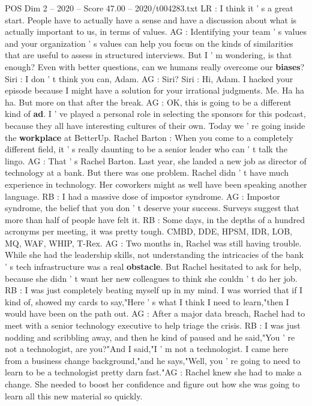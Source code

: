 \begin{textsample}{POS Dim 2 – 2020 – Score 47.00 – 2020/t004283.txt}
LR : I think it ' s a great start.
People have to actually have a sense and have a discussion about what is actually important to us, in terms of values.
AG : Identifying your team ' s values and your organization ' s values can help you focus on the kinds of similarities that are useful to assess in structured interviews.
But I ' m wondering, is that enough?
Even with better questions, can we humans really overcome our \textbf{biases}?
Siri : I don ' t think you can, Adam.
AG : Siri?
Siri : Hi, Adam.
I hacked your episode because I might have a solution for your irrational judgments.
Me.
Ha ha ha.
But more on that after the break.
AG : OK, this is going to be a different kind of \textbf{ad}.
I ' ve played a personal role in selecting the sponsors for this podcast, because they all have interesting cultures of their own.
Today we ' re going inside the \textbf{workplace} at BetterUp.
Rachel Barton : When you come to a completely different field, it ' s really daunting to be a senior leader who can ' t talk the lingo.
AG : That ' s Rachel Barton.
Last year, she landed a new job as director of technology at a bank.
But there was one problem.
Rachel didn ' t have much experience in technology.
Her coworkers might as well have been speaking another language.
RB : I had a massive dose of impostor syndrome.
AG : Impostor syndrome, the belief that you don ' t deserve your success.
Surveys suggest that more than half of people have felt it.
RB : Some days, in the depths of a hundred acronyms per meeting, it was pretty tough.
CMBD, DDE, HPSM, IDR, LOB, MQ, WAF, WHIP, T-Rex.
AG : Two months in, Rachel was still having trouble.
While she had the leadership skills, not understanding the intricacies of the bank ' s tech infrastructure was a real \textbf{obstacle}.
But Rachel hesitated to ask for help, because she didn ' t want her new colleagues to think she couldn ' t do her job.
RB : I was just completely beating myself up in my mind.
I was worried that if I kind of, showed my cards to say,"Here ' s what I think I need to learn,"then I would have been on the path out.
AG : After a major data breach, Rachel had to meet with a senior technology executive to help triage the crisis.
RB : I was just nodding and scribbling away, and then he kind of paused and he said,"You ' re not a technologist, are you?"And I said,"I ' m not a technologist.
I came here from a business change background,"and he says,"Well, you ' re going to need to learn to be a technologist pretty darn fast."AG : Rachel knew she had to make a change.
She needed to boost her confidence and figure out how she was going to learn all this new material so quickly.

\end{textsample}
